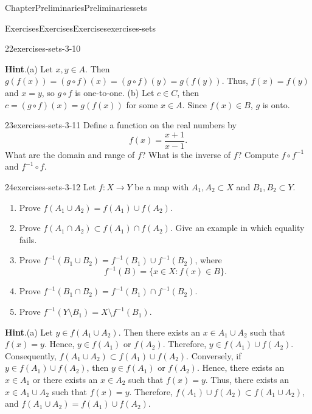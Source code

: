\documentclass[oneside,10pt,]{book}
\newcommand{\blocktitlefont}{\relax}
\numberwithin{equation}{section}
\begin{document}
\begin{chapterptx}{Chapter}{Preliminaries}{}{Preliminaries}{}{}{sets}
\begin{exercises-section}{Exercises}{Exercises}{}{Exercises}{}{}{exercises-sets}
\begin{divisionexercise}{22}{}{}{exercises-sets-3-10}
\begin{enumerate}[label={(\alph*)}]
\end{enumerate}
\par\smallskip%
\noindent\textbf{\blocktitlefont Hint}.\hypertarget{exercises-sets-3-10-2}{}\quad{}(a) Let \(x, y \in A\). Then \(g(f(x)) = (g \circ f)(x) = (g \circ f)(y) = g(f(y))\).  Thus, \(f(x) = f(y)\) and \(x = y\),  so \(g \circ f\) is one-to-one. (b) Let \(c \in C\), then \(c = (g \circ f)(x) = g(f(x))\) for some \(x \in A\). Since \(f(x) \in B\), \(g\) is onto.%
\end{divisionexercise}%
\begin{divisionexercise}{23}{}{}{exercises-sets-3-11}%
Define a function on the real numbers by%
\begin{equation*}
f(x) = \frac{x + 1}{x - 1}.
\end{equation*}
What are the domain and range of \(f\)? What is the inverse of \(f\)?  Compute \(f \circ f^{-1}\) and \(f^{-1} \circ f\).%
\end{divisionexercise}%
\begin{divisionexercise}{24}{}{}{exercises-sets-3-12}%
Let \(f: X \rightarrow Y\) be a map with \(A_1, A_2 \subset X\) and \(B_1, B_2 \subset Y\).%
%
\begin{enumerate}[label={(\alph*)}]
\item{}Prove \(f( A_1 \cup A_2 ) = f( A_1) \cup f( A_2 )\).%
\item{}Prove \(f( A_1 \cap A_2 ) \subset f( A_1) \cap f( A_2 )\).  Give an example in which equality fails.%
\item{}Prove \(f^{-1}( B_1 \cup B_2 ) = f^{-1}( B_1) \cup f^{-1}(B_2 )\), where%
\begin{equation*}
f^{-1}(B) = \{ x \in X : f(x) \in B \}.
\end{equation*}
%
\item{}Prove \(f^{-1}( B_1 \cap B_2 ) = f^{-1}( B_1) \cap f^{-1}( B_2 )\).%
\item{}Prove \(f^{-1}( Y \setminus B_1 ) = X \setminus f^{-1}( B_1)\).%
\end{enumerate}
\par\smallskip%
\noindent\textbf{\blocktitlefont Hint}.\hypertarget{exercises-sets-3-12-2}{}\quad{}(a) Let \(y \in f(A_1 \cup A_2)\).  Then there exists an \(x \in A_1 \cup A_2\) such that \(f(x) = y\).  Hence, \(y \in f(A_1)\) or \(f(A_2) \).  Therefore, \(y \in f(A_1) \cup f(A_2)\). Consequently, \(f(A_1 \cup A_2) \subset f(A_1) \cup f(A_2)\). Conversely, if \(y \in f(A_1) \cup f(A_2)\), then \(y \in f(A_1)\) or \(f(A_2)\).  Hence, there exists an \(x \in A_1\) or there exists an \(x \in A_2\) such that \(f(x) = y\).  Thus, there exists an \(x \in A_1 \cup A_2\) such that \(f(x) = y\).  Therefore, \(f(A_1) \cup f(A_2) \subset f(A_1 \cup A_2)\), and \(f(A_1 \cup A_2) = f(A_1) \cup f(A_2)\).%

\end{divisionexercise}
\end{exercises-section}
\end{chapterptx}
\end{document}
